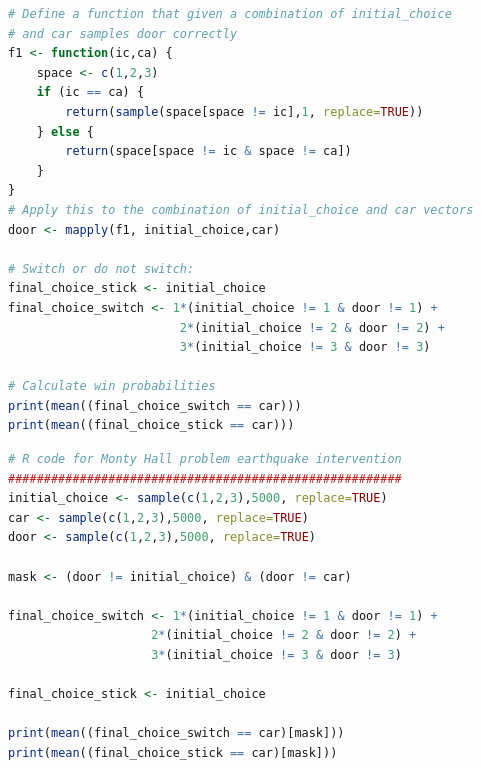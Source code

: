 \begin{enumerate}
\begin{lstlisting}[language=R]
# Define a function that given a combination of initial_choice 
# and car samples door correctly
f1 <- function(ic,ca) {
    space <- c(1,2,3)
    if (ic == ca) {
        return(sample(space[space != ic],1, replace=TRUE))
    } else {
        return(space[space != ic & space != ca])
    }
}
# Apply this to the combination of initial_choice and car vectors
door <- mapply(f1, initial_choice,car)

# Switch or do not switch:
final_choice_stick <- initial_choice
final_choice_switch <- 1*(initial_choice != 1 & door != 1) + 
                        2*(initial_choice != 2 & door != 2) + 
                        3*(initial_choice != 3 & door != 3)

# Calculate win probabilities
print(mean((final_choice_switch == car)))
print(mean((final_choice_stick == car)))
\end{lstlisting}

\begin{lstlisting}[language=R]
# R code for Monty Hall problem earthquake intervention
#######################################################
initial_choice <- sample(c(1,2,3),5000, replace=TRUE)
car <- sample(c(1,2,3),5000, replace=TRUE)
door <- sample(c(1,2,3),5000, replace=TRUE)

mask <- (door != initial_choice) & (door != car) 

final_choice_switch <- 1*(initial_choice != 1 & door != 1) + 
                    2*(initial_choice != 2 & door != 2) + 
                    3*(initial_choice != 3 & door != 3)

final_choice_stick <- initial_choice

print(mean((final_choice_switch == car)[mask]))
print(mean((final_choice_stick == car)[mask]))
\end{lstlisting}

\end{enumerate}


